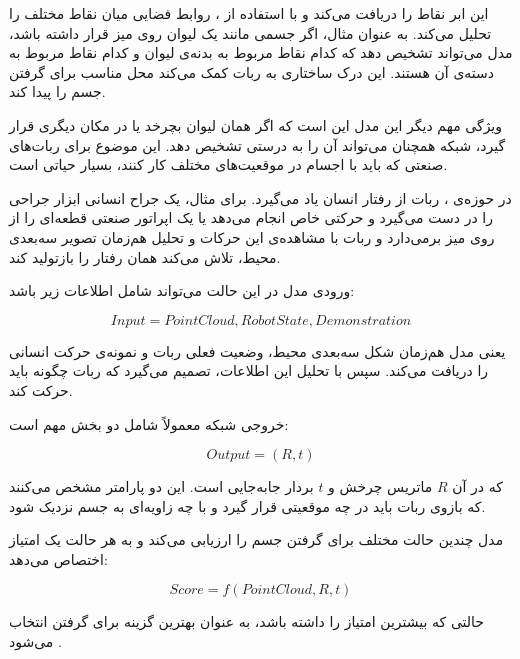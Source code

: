 \documentclass{article}
\begin{document}
 این ابر نقاط را دریافت می‌کند و با استفاده از ، روابط فضایی میان نقاط مختلف را تحلیل می‌کند. به عنوان مثال، اگر جسمی مانند یک لیوان روی میز قرار داشته باشد، مدل می‌تواند تشخیص دهد که کدام نقاط مربوط به بدنه‌ی لیوان و کدام نقاط مربوط به دسته‌ی آن هستند. این درک ساختاری به ربات کمک می‌کند محل مناسب برای گرفتن جسم را پیدا کند.

ویژگی‌ مهم دیگر این مدل این است که اگر همان لیوان بچرخد یا در مکان دیگری قرار گیرد، شبکه همچنان می‌تواند آن را به درستی تشخیص دهد. این موضوع برای ربات‌های صنعتی که باید با اجسام در موقعیت‌های مختلف کار کنند، بسیار حیاتی است.

در حوزه‌ی ، ربات از رفتار انسان یاد می‌گیرد. برای مثال، یک جراح انسانی ابزار جراحی را در دست می‌گیرد و حرکتی خاص انجام می‌دهد یا یک اپراتور صنعتی قطعه‌ای را از روی میز برمی‌دارد و ربات با مشاهده‌ی این حرکات و تحلیل هم‌زمان تصویر سه‌بعدی محیط، تلاش می‌کند همان رفتار را بازتولید کند.



ورودی مدل در این حالت می‌تواند شامل اطلاعات زیر باشد:

\[
Input=PointCloud, RobotState, Demonstration
\]

یعنی مدل هم‌زمان شکل سه‌بعدی محیط، وضعیت فعلی ربات و نمونه‌ی حرکت انسانی را دریافت می‌کند. سپس با تحلیل این اطلاعات، تصمیم می‌گیرد که ربات چگونه باید حرکت کند.

خروجی شبکه معمولاً شامل دو بخش مهم است:

\[
Output=(R,t)
\]

که در آن \(R\) ماتریس چرخش و \(t\) بردار جابه‌جایی است. این دو پارامتر مشخص می‌کنند که بازوی ربات باید در چه موقعیتی قرار گیرد و با چه زاویه‌ای به جسم نزدیک شود.

مدل  چندین حالت مختلف برای گرفتن جسم را ارزیابی می‌کند و به هر حالت یک امتیاز اختصاص می‌دهد:

\[
Score=f(PointCloud,R,t)
\]

حالتی که بیشترین امتیاز را داشته باشد، به عنوان بهترین گزینه برای گرفتن انتخاب می‌شود  \cite{fuchs2020} \cite{levine2016} \cite{siciliano2009}.


\newpage
\begin{LTR}
\printbibliography
\end{LTR}
\end{document}
